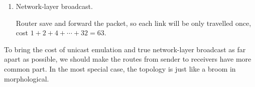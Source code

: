 \begin{enumerate}
\begin{enumerate}
	    \item Network-layer broadcast.
	    	    
	    Router save and forward the packet, so each link will be only travelled once, cost $1 + 2 + 4 + \cdots + 32 = 63$.
	    
	\end{enumerate}
	
	To bring the cost of unicast emulation and true network-layer broadcast as far apart as possible, we should make the routes from sender to receivers have more common part. In the most special case, the topology is just like a broom in morphological.
	
	
\end{enumerate}
